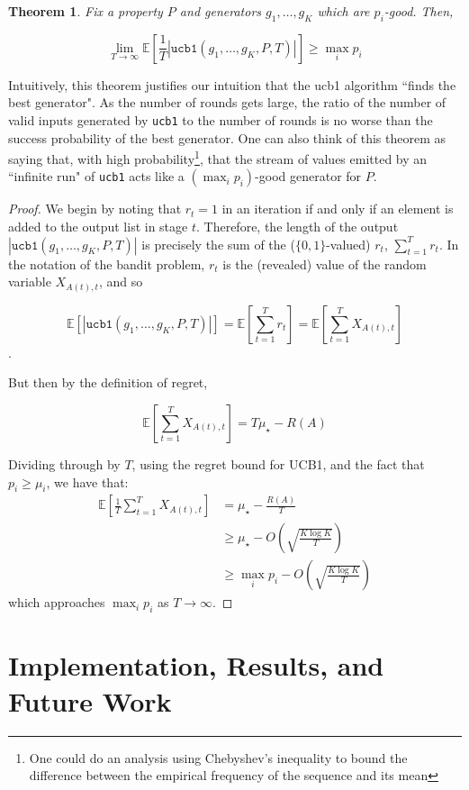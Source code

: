 \documentclass[sigconf,nonacm]{acmart}
\newtheorem{theorem}{Theorem}
\begin{document}
\begin{theorem}
Fix a property $P$ and generators $g_1,\dots,g_K$ which are $p_i$-good. Then,

$$
\lim_{T \to \infty} \mathbb{E}\left[\frac{1}{T}\left|\texttt{ucb1}(g_1,\dots,g_K,P,T)\right|\right] \geq \max_i p_i
$$
\end{theorem}
Intuitively, this theorem justifies our intuition that the ucb1 algorithm ``finds the best generator". As the number of rounds gets large, the ratio of the number of valid inputs generated by \texttt{ucb1} to the number of rounds is no worse than the success probability of the best generator. One can also think of this theorem as saying that, with high probability\footnote{One could do an analysis using Chebyshev's inequality to bound the difference between the empirical frequency of the sequence and its mean}, that the stream of values emitted by an ``infinite run" of \texttt{ucb1} acts like a $(\max_i p_i)$-good generator for $P$.
\begin{proof}
We begin by noting that $r_t = 1$ in an iteration if and only if an element is added to the output list in stage $t$. Therefore, the length of the output $\left|\texttt{ucb1}(g_1,\dots,g_K,P,T)\right|$ is precisely the sum of the ($\{0,1\}$-valued) $r_t$, $\sum_{t=1}^T r_t$. In the notation of the bandit problem, $r_t$ is the (revealed) value of the random variable $X_{A(t),t}$, and so 

$$\mathbb{E}\left[\left|\texttt{ucb1}(g_1,\dots,g_K,P,T)\right|\right] = \mathbb{E}\left[\sum_{t=1}^T r_t\right] = \mathbb{E}\left[\sum_{t=1}^T X_{A(t),t}\right]$$.

But then by the definition of regret,

$$
\mathbb{E}\left[\sum_{t=1}^T X_{A(t),t}\right] = T\mu_{\star} - R(A)
$$

Dividing through by $T$, using the regret bound for UCB1, and the fact that $p_i \geq \mu_i$, we have that:
\begin{align*}
\mathbb{E}\left[\frac{1}{T}\sum_{t=1}^T X_{A(t),t}\right] &= \mu_\star - \frac{R(A)}{T}\\
&\geq \mu_{\star} - O\left(\sqrt{\frac{K\log K}{T}}\right)\\
&\geq \max_i p_i - O\left(\sqrt{\frac{K\log K}{T}}\right)
\end{align*}
which approaches $\max_i p_i$ as $T \to \infty$.
\end{proof}

\section{Implementation, Results, and Future Work}
\label{sec:impl}
\end{document}
